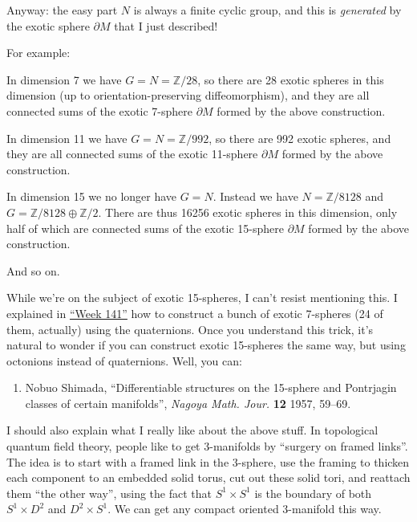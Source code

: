 \documentclass{article}
\def\tightlist{}
\begin{document}
Anyway: the easy part \(N\) is always a finite cyclic group, and this is
\emph{generated} by the exotic sphere \(\partial M\) that I just
described!

For example:

In dimension 7 we have \(G = N = \mathbb{Z}/28\), so there are 28 exotic
spheres in this dimension (up to orientation-preserving diffeomorphism),
and they are all connected sums of the exotic 7-sphere \(\partial M\)
formed by the above construction.

In dimension 11 we have \(G = N = \mathbb{Z}/992\), so there are 992
exotic spheres, and they are all connected sums of the exotic 11-sphere
\(\partial M\) formed by the above construction.

In dimension 15 we no longer have \(G = N\). Instead we have
\(N = \mathbb{Z}/8128\) and \(G = \mathbb{Z}/8128\oplus \mathbb{Z}/2\).
There are thus 16256 exotic spheres in this dimension, only half of
which are connected sums of the exotic 15-sphere \(\partial M\) formed
by the above construction.

And so on.

While we're on the subject of exotic 15-spheres, I can't resist
mentioning this. I explained in \protect\hyperlink{week141}{``Week
141''} how to construct a bunch of exotic 7-spheres (24 of them,
actually) using the quaternions. Once you understand this trick, it's
natural to wonder if you can construct exotic 15-spheres the same way,
but using octonions instead of quaternions. Well, you can:

\begin{enumerate}
\def\labelenumi{\arabic{enumi})}
\setcounter{enumi}{2}
\tightlist
\item
  Nobuo Shimada, ``Differentiable structures on the 15-sphere and
  Pontrjagin classes of certain manifolds'', \emph{Nagoya Math. Jour.}
  \textbf{12} 1957, 59--69.
\end{enumerate}

I should also explain what I really like about the above stuff. In
topological quantum field theory, people like to get 3-manifolds by
``surgery on framed links''. The idea is to start with a framed link in
the 3-sphere, use the framing to thicken each component to an embedded
solid torus, cut out these solid tori, and reattach them ``the other
way'', using the fact that \(S^1\times S^1\) is the boundary of both
\(S^1\times D^2\) and \(D^2\times S^1\). We can get any compact oriented
3-manifold this way.
\end{document}
